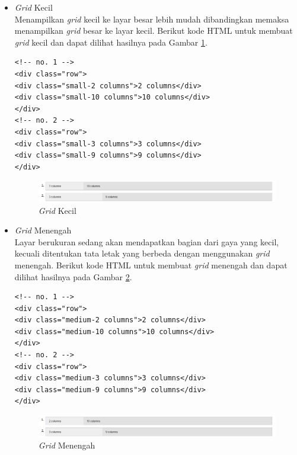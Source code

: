 \begin{itemize}
\begin{itemize}
\begin{enumerate}[(1)]
\begin{itemize}
\item {\it Grid} Kecil\\
Menampilkan {\it grid} kecil ke layar besar lebih mudah dibandingkan memaksa
menampilkan {\it grid} besar ke layar kecil. Berikut kode HTML untuk membuat
{\it grid} kecil dan dapat dilihat hasilnya pada Gambar \ref{fig:gridkecil}.
\begin{lstlisting}[basicstyle=\footnotesize]
<!-- no. 1 -->
<div class="row">
<div class="small-2 columns">2 columns</div>
<div class="small-10 columns">10 columns</div>
</div>
<!-- no. 2 -->
<div class="row">
<div class="small-3 columns">3 columns</div>
<div class="small-9 columns">9 columns</div>
</div>
\end{lstlisting}
\begin{figure}[H]
\centering
\includegraphics[scale=0.6]{Gambar/gridkecil.png}
\caption[{\it Grid} Kecil]{{\it Grid} Kecil}
\label{fig:gridkecil}
\end{figure}
\item {\it Grid} Menengah\\
Layar berukuran sedang akan mendapatkan bagian dari gaya yang kecil, kecuali
ditentukan tata letak yang berbeda dengan menggunakan {\it grid} menengah.
Berikut kode HTML untuk membuat {\it grid} menengah dan dapat dilihat
hasilnya pada Gambar \ref{fig:gridmenengah}.
\begin{lstlisting}[basicstyle=\footnotesize]
<!-- no. 1 -->
<div class="row">
<div class="medium-2 columns">2 columns</div>
<div class="medium-10 columns">10 columns</div>
</div>
<!-- no. 2 -->
<div class="row">
<div class="medium-3 columns">3 columns</div>
<div class="medium-9 columns">9 columns</div>
</div>
\end{lstlisting}
\begin{figure}[H]
\centering
\includegraphics[scale=0.6]{Gambar/gridmenengah.png}
\caption[{\it Grid} Menengah]{{\it Grid} Menengah}
\label{fig:gridmenengah}
\end{figure}


\end{itemize}
\end{enumerate}
\end{itemize}
\end{itemize}
